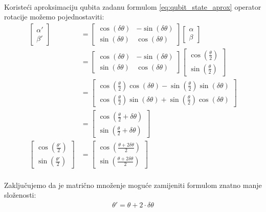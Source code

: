 \documentclass[times, utf8, zavrsni, numeric]{fer}
\begin{document}
\paragraph{}
Koristeći aproksimaciju qubita zadanu formulom \ref{eq:qubit_state_aprox} operator rotacije možemo pojednostaviti:
\begin{align*}
\begin{bmatrix}
\alpha' \\ \beta'
\end{bmatrix}
&=
\begin{bmatrix}
\cos(\delta\theta) & -\sin(\delta\theta) \\ \sin(\delta\theta) & \cos(\delta\theta)
\end{bmatrix}
\begin{bmatrix}
\alpha \\ \beta
\end{bmatrix}
\\&=
\begin{bmatrix}
\cos(\delta\theta) & -\sin(\delta\theta) \\ \sin(\delta\theta) & \cos(\delta\theta)
\end{bmatrix}
\begin{bmatrix}
\cos(\frac{\theta}{2}) \\ \sin(\frac{\theta}{2})
\end{bmatrix}
\\&=
\begin{bmatrix}
\cos(\frac{\theta}{2})\cos(\delta\theta) - \sin(\frac{\theta}{2})\sin(\delta\theta) \\ \cos(\frac{\theta}{2})\sin(\delta\theta) + \sin(\frac{\theta}{2})\cos(\delta\theta)
\end{bmatrix}
\\&=
\begin{bmatrix}
\cos(\frac{\theta}{2}+\delta\theta) \\ \sin(\frac{\theta}{2}+\delta\theta)
\end{bmatrix} 
\\
\begin{bmatrix}
\cos(\frac{\theta'}{2}) \\ \sin(\frac{\theta'}{2})
\end{bmatrix}
&=
\begin{bmatrix}
\cos(\frac{\theta+2\delta\theta}{2}) \\ \sin(\frac{\theta+2\delta\theta}{2})
\end{bmatrix}
\end{align*}

\paragraph{}
Zaključujemo da je matrično množenje moguće zamijeniti formulom znatno manje složenosti:
\begin{align} \label{eq:qrot_simple}
\theta' = \theta + 2\cdot \delta\theta
\end{align}
\end{document}
